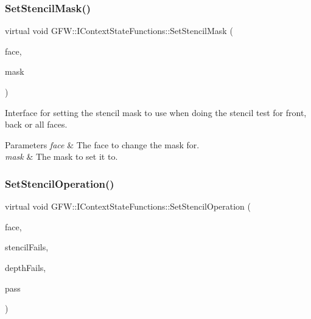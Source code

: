 \subsubsection{\texorpdfstring{Set\+Stencil\+Mask()}{SetStencilMask()}}
{\footnotesize\ttfamily virtual void G\+F\+W\+::\+I\+Context\+State\+Functions\+::\+Set\+Stencil\+Mask (\begin{DoxyParamCaption}\item[{\hyperlink{namespace_g_f_w_a393ef12f1927ff3e7b73b11f72d551eb}{Face\+Direction}}]{face,  }\item[{int}]{mask }\end{DoxyParamCaption})\hspace{0.3cm}{\ttfamily [pure virtual]}}



Interface for setting the stencil mask to use when doing the stencil test for front, back or all faces. 


\begin{DoxyParams}{Parameters}
{\em face} & The face to change the mask for. \\
\hline
{\em mask} & The mask to set it to. \\
\hline
\end{DoxyParams}
\mbox{\label{class_g_f_w_1_1_i_context_state_functions_a63c7024e6bc6b8b3d74bb552e4edfc3f}} 
\subsubsection{\texorpdfstring{Set\+Stencil\+Operation()}{SetStencilOperation()}}
{\footnotesize\ttfamily virtual void G\+F\+W\+::\+I\+Context\+State\+Functions\+::\+Set\+Stencil\+Operation (\begin{DoxyParamCaption}\item[{\hyperlink{namespace_g_f_w_a393ef12f1927ff3e7b73b11f72d551eb}{Face\+Direction}}]{face,  }\item[{\hyperlink{namespace_g_f_w_a6a4cd1647d3100386320b711cdda20d4}{Test\+Operation}}]{stencil\+Fails,  }\item[{\hyperlink{namespace_g_f_w_a6a4cd1647d3100386320b711cdda20d4}{Test\+Operation}}]{depth\+Fails,  }\item[{\hyperlink{namespace_g_f_w_a6a4cd1647d3100386320b711cdda20d4}{Test\+Operation}}]{pass }\end{DoxyParamCaption})\hspace{0.3cm}{\ttfamily [pure virtual]}}



